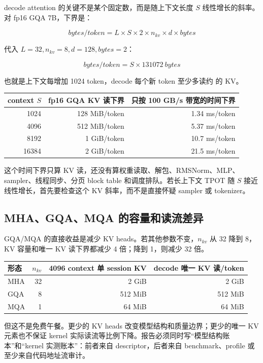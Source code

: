 decode attention 的关键不是某个固定数，而是随上下文长度 \(S\) 线性增长的斜率。对 fp16 GQA 7B，下界是：

\[
bytes/token = L \times S \times 2 \times n_{kv} \times d \times bytes
\]

代入 \(L=32,n_{kv}=8,d=128,bytes=2\)：

\[
bytes/token = S \times 131072\ bytes
\]

也就是上下文每增加 1024 token，decode 每个新 token 至少多读约  的 KV。

\begin{center}
\begin{tabular}{r r r}
\toprule
context \(S\) & fp16 GQA KV 读下界 & 只按 100 GB/s 带宽的时间下界 \\
\midrule
1024 & 128 MiB/token & 1.34 ms/token \\
4096 & 512 MiB/token & 5.37 ms/token \\
8192 & 1 GiB/token & 10.7 ms/token \\
16384 & 2 GiB/token & 21.5 ms/token \\
\bottomrule
\end{tabular}
\end{center}

这个时间下界只算 KV 读，还没有算权重读取、解包、RMSNorm、MLP、sampler、线程同步、分页 block table 和调度排队。若长上下文 TPOT 随 \(S\) 接近线性增长，首先要检查这个 KV 斜率，而不是直接怀疑 sampler 或 tokenizer。

\subsection{MHA、GQA、MQA 的容量和读流差异}

GQA/MQA 的直接收益是减少 KV heads。若其他参数不变，\(n_{kv}\) 从 32 降到 8，KV 容量和唯一 KV 读下界都减少 4 倍；降到 1，则减少 32 倍。

\begin{center}
\begin{tabular}{l r r r}
\toprule
形态 & \(n_{kv}\) & 4096 context 单 session KV & decode 唯一 KV 读/token \\
\midrule
MHA & 32 & 2 GiB & 2 GiB \\
GQA & 8 & 512 MiB & 512 MiB \\
MQA & 1 & 64 MiB & 64 MiB \\
\bottomrule
\end{tabular}
\end{center}

但这不是免费午餐。更少的 KV heads 改变模型结构和质量边界；更少的唯一 KV 元素也不保证 kernel 实际读流等比例下降。报告必须同时写“模型结构账本”和“kernel 实测账本”：前者来自 descriptor，后者来自 benchmark、profile 或至少来自代码地址流审计。

